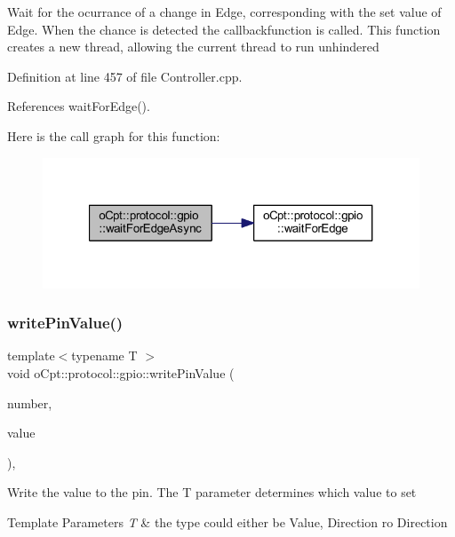 Wait for the ocurrance of a change in Edge, corresponding with the set value of Edge. When the chance is detected the callbackfunction is called. This function creates a new thread, allowing the current thread to run unhindered 

Definition at line 457 of file Controller.\+cpp.



References wait\+For\+Edge().

Here is the call graph for this function\+:\nopagebreak
\begin{figure}[H]
\begin{center}
\leavevmode
\includegraphics[width=321pt]{classo_cpt_1_1protocol_1_1gpio_a02375f321f838da5f738eda8631ae0cc_cgraph}
\end{center}
\end{figure}
\hypertarget{classo_cpt_1_1protocol_1_1gpio_a0f2972fa7ad1981c7edeae79280aa11f}{}\label{classo_cpt_1_1protocol_1_1gpio_a0f2972fa7ad1981c7edeae79280aa11f} 
\subsubsection{\texorpdfstring{write\+Pin\+Value()}{writePinValue()}\hspace{0.1cm}{\footnotesize\ttfamily [1/2]}}
{\footnotesize\ttfamily template$<$typename T $>$ \\
void o\+Cpt\+::protocol\+::gpio\+::write\+Pin\+Value (\begin{DoxyParamCaption}\item[{const int \&}]{number,  }\item[{const T \&}]{value }\end{DoxyParamCaption})\hspace{0.3cm}{\ttfamily [inline]}, {\ttfamily [private]}}

Write the value to the pin. The T parameter determines which value to set 
\begin{DoxyTemplParams}{Template Parameters}
{\em T} & the type could either be Value, Direction ro Direction \\
\hline
\end{DoxyTemplParams}

